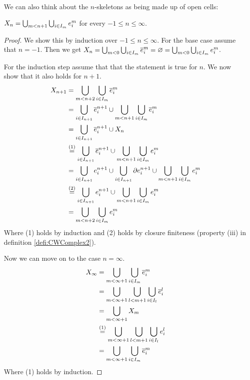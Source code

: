 We can also think about the $n$-skeletons as being made up of open cells: 

\begin{lem}
    $X_n = \bigcup_{m < n + 1}\bigcup_{i \in I_m} \ocell{m}{i}$ for every $-1 \le n \le \infty$.
\end{lem}
\begin{proof}
    We show this by induction over $-1 \le n \le \infty$. 
    For the base case assume that $n = -1$.
    Then we get $X_n = \bigcup_{m < 0}\bigcup_{i \in I_m}\ccell{m}{i} = \varnothing = \bigcup_{m < 0}\bigcup_{i \in I_m} \ocell{m}{i}$.

    For the induction step assume that that the statement is true for $n$.
    We now show that it also holds for $n + 1$.
    \begin{equation*}
        \begin{split}
            X_{n + 1} &= \bigcup_{m < n + 2}\bigcup_{i \in I_m} \ccell{m}{i} \\ 
            &=\bigcup_{i \in I_{n + 1}}\ccell{n+1}{i} \cup \bigcup_{m < n + 1}\bigcup_{i \in I_m} \ccell{m}{i} \\
            &= \bigcup_{i \in I_{n + 1}}\ccell{n+1}{i} \cup X_n \\
            &\stackrel{(1)}{=} \bigcup_{i \in I_{n + 1}}\ccell{n+1}{i} \cup \bigcup_{m < n + 1}\bigcup_{i \in I_m} \ocell{m}{i} \\ 
            &= \bigcup_{i \in I_{n + 1}}\ocell{n+1}{i} \cup \bigcup_{i \in I_{n + 1}}\ecell{n+1}{i} \cup \bigcup_{m < n + 1}\bigcup_{i \in I_m} \ocell{m}{i} \\
            &\stackrel{(2)}{=} \bigcup_{i \in I_{n + 1}}\ocell{n+1}{i} \cup \bigcup_{m < n + 1}\bigcup_{i \in I_m} \ocell{m}{i} \\
            &= \bigcup_{m < n + 2}\bigcup_{i \in I_m} \ocell{m}{i} 
        \end{split}
    \end{equation*}
    Where (1) holds by induction and (2) holds by closure finiteness (property (iii) in definition \ref{defi:CWComplex2}).

    Now we can move on to the case $n = \infty$.
    \begin{equation*}
        \begin{split}
            X_{\infty} &= \bigcup_{m < \infty + 1}\bigcup_{i \in I_m}\ccell{m}{i} \\
            &= \bigcup_{m < \infty + 1}\bigcup_{l < m + 1}\bigcup_{i \in I_l}\ccell{l}{i} \\
            &= \bigcup_{m < \infty + 1} X_m \\ 
            &\stackrel{(1)}{=} \bigcup_{m < \infty + 1}\bigcup_{l < m + 1}\bigcup_{i \in I_l}\ocell{l}{i} \\
            &= \bigcup_{m < \infty + 1}\bigcup_{i \in I_m}\ccell{m}{i} 
        \end{split}
    \end{equation*}
    Where (1) holds by induction.
\end{proof}

